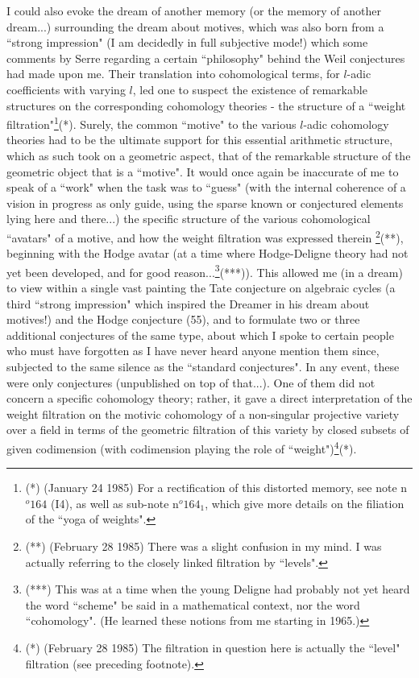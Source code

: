I could also evoke the dream of another memory (or the memory of another dream...) surrounding the dream about motives, which was also born from a ``strong impression" (I am decidedly in full subjective mode!) which some comments by Serre regarding a certain ``philosophy" behind the Weil conjectures had made upon me. Their translation into cohomological terms, for $l$-adic coefficients with varying $l$, led one to suspect the existence of remarkable structures on the corresponding cohomology theories - the structure of a ``weight filtration"\footnote{(*) (January 24 1985) For a rectification of this distorted memory, see note n$^o 164$ (I4), as well as sub-note n$^o 164_1$, which give more details on the filiation of the ``yoga of weights".}(*). Surely, the common ``motive" to the various $l$-adic cohomology theories had to be the ultimate support for this essential arithmetic structure, which as such took on a geometric aspect, that of the remarkable structure of the geometric object that is a ``motive". It would once again be inaccurate of me to speak of a ``work" when the task was to ``guess" (with the internal coherence of a vision in progress as only guide, using the sparse known or conjectured elements lying here and there...) the specific structure of the various cohomological ``avatars" of a motive, and how the weight filtration was expressed therein
\footnote{(**) (February 28 1985) There was a slight confusion in my mind. I was actually referring to the closely linked filtration by ``levels".}(**), beginning with the Hodge avatar (at a time where Hodge-Deligne theory had not yet been developed, and for good reason...\footnote{(***) This was at a time when the young Deligne had probably not yet heard the word ``scheme" be said in a mathematical context, nor the word ``cohomology". (He learned these notions from me starting in 1965.)}(***)). This allowed me (in a dream) to view within a single vast painting the Tate conjecture on algebraic cycles (a third ``strong impression" which inspired the Dreamer in his dream about motives!) and the Hodge conjecture (55), and to formulate two or three additional conjectures of the same type, about which I spoke to certain people who must have forgotten as I have never heard anyone mention them since, subjected to the same silence as the ``standard conjectures". In any event, these were only conjectures (unpublished on top of that...). One of them did not concern a specific cohomology theory; rather, it gave a direct interpretation of the weight filtration on the motivic cohomology of a non-singular projective variety over a field in terms of the geometric filtration of this variety by closed subsets of given codimension (with codimension playing the role of ``weight")\footnote{(*) (February 28 1985) The filtration in question here is actually the ``level" filtration (see preceding footnote).}(*).

